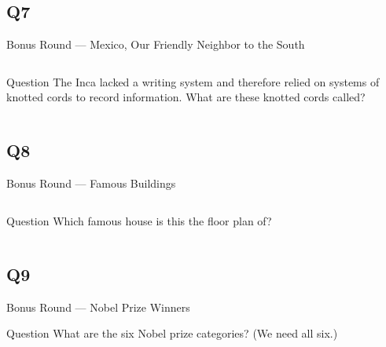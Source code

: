 \documentclass[11pt,draft]{beamer}
\begin{document}
\subsection*{Q7}
\begin{frame}[t]{Bonus Round --- Mexico, Our Friendly Neighbor to the South}
    \begin{columns}[T,totalwidth=\linewidth]
        \begin{column}{0.32\linewidth}
            \begin{block}{Question}
                The Inca lacked a writing system and therefore relied on systems of knotted cords to record information. What are these knotted cords called?
            \end{block}
        \end{column}
        \begin{column}{0.65\linewidth}
            \begin{center}
                \texttt{[image: \{Images/quipu]}.jpg}
            \end{center}
        \end{column}
    \end{columns}
\end{frame}
\subsection*{Q8}
\begin{frame}[t]{Bonus Round --- Famous Buildings}
    \begin{columns}[T,totalwidth=\linewidth]
        \begin{column}{0.32\linewidth}
            \begin{block}{Question}
                Which famous house is this the floor plan of?
            \end{block}
        \end{column}
        \begin{column}{0.65\linewidth}
            \begin{center}
                \texttt{[image: \{Images/fallingwaterfloorplan]}.jpg}
            \end{center}
        \end{column}
    \end{columns}
\end{frame}
\subsection*{Q9}
\begin{frame}[t]{Bonus Round --- Nobel Prize Winners}
    \begin{block}{Question}
        What are the six Nobel prize categories? (We need all six.)
    \end{block}
\end{frame}
\end{document}
